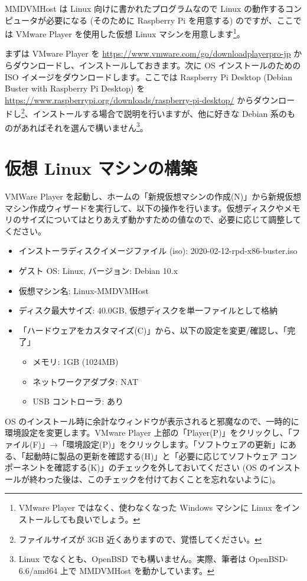 \documentclass[a4j,oneside]{ujbook}
\begin{document}
MMDVMHost は Linux 向けに書かれたプログラムなので Linux の動作するコンピュータが必要になる (そのために Raspberry Pi を用意する) のですが、ここでは VMware Player を使用した仮想 Linux マシンを用意します\footnote{VMware Player ではなく、使わなくなった Windows マシンに Linux をインストールしても良いでしょう。}。

まずは VMware Player を \url{https://www.vmware.com/go/downloadplayerpro-jp} からダウンロードし、インストールしておきます。次に OS インストールのための ISO イメージをダウンロードします。ここでは Raspberry Pi Desktop (Debian Buster with Raspberry Pi Desktop) を \url{https://www.raspberrypi.org/downloads/raspberry-pi-desktop/} からダウンロードし\footnote{ファイルサイズが 3GB 近くありますので、覚悟してください。}、インストールする場合で説明を行いますが、他に好きな Debian 系のものがあればそれを選んで構いません\footnote{Linux でなくとも、OpenBSD でも構いません。実際、筆者は OpenBSD-6.6/amd64 上で MMDVMHost を動かしています。}。

\section{仮想 Linux マシンの構築}

VMWare Player を起動し、ホームの「新規仮想マシンの作成(N)」から新規仮想マシン作成ウィザードを実行して、以下の操作を行います。仮想ディスクやメモリのサイズについてはとりあえず動かすための値なので、必要に応じて調整してください。

\begin{itemize}
 \item インストーラディスクイメージファイル (iso): 2020-02-12-rpd-x86-buster.iso
 \item ゲスト OS: Linux, バージョン: Debian 10.x
 \item 仮想マシン名: Linux-MMDVMHost
 \item ディスク最大サイズ: 40.0GB, 仮想ディスクを単一ファイルとして格納
 \item 「ハードウェアをカスタマイズ(C)」から、以下の設定を変更/確認し、「完了」
 \begin{itemize}
  \item メモリ: 1GB (1024MB)
  \item ネットワークアダプタ: NAT
  \item USB コントローラ: あり
 \end{itemize}
\end{itemize}

OS のインストール時に余計なウィンドウが表示されると邪魔なので、一時的に環境設定を変更します。VMware Player 上部の「Player(P)」をクリックし、「ファイル(F)」→「環境設定(P)」をクリックします。「ソフトウェアの更新」にある、「起動時に製品の更新を確認する(H)」と「必要に応じてソフトウェア コンポーネントを確認する(K)」のチェックを外しておいてください (OS のインストールが終わった後は、このチェックを付けておくことを忘れないように)。
\end{document}
